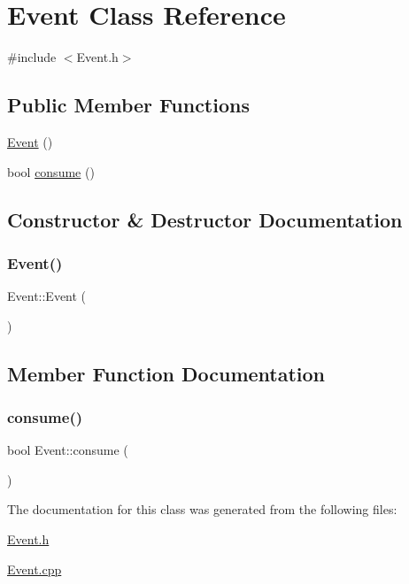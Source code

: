 \hypertarget{class_event}{}\section{Event Class Reference}
\label{class_event}


{\ttfamily \#include $<$Event.\+h$>$}

\subsection*{Public Member Functions}
\begin{DoxyCompactItemize}
\item 
\hyperlink{class_event_a5a40dd4708297f7031e29b39e039ae10}{Event} ()
\item 
bool \hyperlink{class_event_a93521bedffd2a0b9c979e15241e060ba}{consume} ()
\end{DoxyCompactItemize}


\subsection{Constructor \& Destructor Documentation}
\mbox{\label{class_event_a5a40dd4708297f7031e29b39e039ae10}} 
\subsubsection{\texorpdfstring{Event()}{Event()}}
{\footnotesize\ttfamily Event\+::\+Event (\begin{DoxyParamCaption}{ }\end{DoxyParamCaption})}



\subsection{Member Function Documentation}
\mbox{\label{class_event_a93521bedffd2a0b9c979e15241e060ba}} 
\subsubsection{\texorpdfstring{consume()}{consume()}}
{\footnotesize\ttfamily bool Event\+::consume (\begin{DoxyParamCaption}{ }\end{DoxyParamCaption})}



The documentation for this class was generated from the following files\+:\begin{DoxyCompactItemize}
\item 
\hyperlink{_event_8h}{Event.\+h}\item 
\hyperlink{_event_8cpp}{Event.\+cpp}\end{DoxyCompactItemize}
